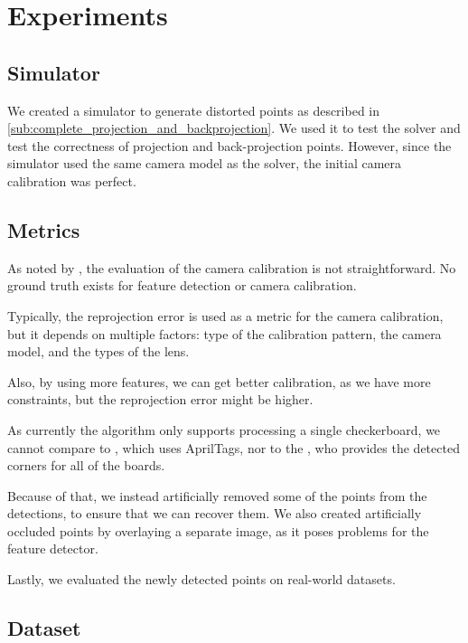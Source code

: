 \chapter{Experiments}\label{cha:experiments}

\section{Simulator}\label{sec:simulator}

We created a simulator to generate distorted points as described in
\cref{sub:complete_projection_and_backprojection}. We used it to test the
solver and test the correctness of projection and back-projection points.
However, since the simulator used the same camera model as the solver, the
initial camera calibration was perfect.

\section{Metrics}\label{sec:metrics}

As noted by \cite{duisterhofTartanCalibIterativeWideAngle2022}, the evaluation
of the camera calibration is not straightforward. No ground truth exists for
feature detection or camera calibration.

Typically, the reprojection error is used as a metric for the camera
calibration, but it depends on multiple factors: type of the calibration
pattern, the camera model, and the types of the lens.

Also, by using more features, we can get better calibration, as we have more
constraints, but the reprojection error might be higher.

As currently the algorithm only supports processing a single checkerboard, we
cannot compare to \cite{duisterhofTartanCalibIterativeWideAngle2022}, which uses
AprilTags, nor to the \cite{lochmanBabelCalibUniversalApproach2021}, who
provides the detected corners for all of the boards.

Because of that, we instead artificially removed some of the points from the
detections, to ensure that we can recover them. We also created
artificially occluded points by overlaying a separate image, as it poses
problems for the feature detector.

Lastly, we evaluated the newly detected points on real-world datasets.

\section{Dataset}\label{sec:dataset}

